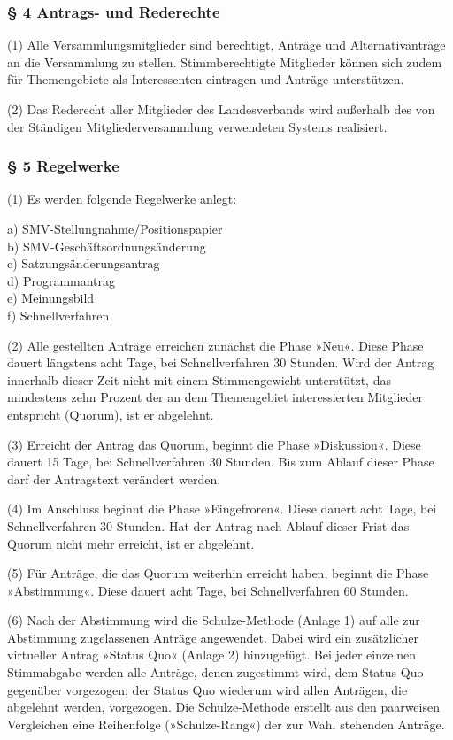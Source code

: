 \subsubsection{§ 4 Antrags- und Rederechte}

(1) Alle Versammlungsmitglieder sind berechtigt, Anträge und Alternativanträge an die Versammlung zu stellen. Stimmberechtigte Mitglieder können sich zudem für Themengebiete als Interessenten eintragen und Anträge unterstützen.

(2) Das Rederecht aller Mitglieder des Landesverbands wird außerhalb des von der Ständigen Mitgliederversammlung verwendeten Systems realisiert.

\subsubsection{§ 5 Regelwerke}

(1) Es werden folgende Regelwerke anlegt:

a) SMV-Stellungnahme/Positionspapier\\b) SMV-Geschäftsordnungsänderung \\c) Satzungsänderungsantrag\\d) Programmantrag\\e) Meinungsbild\\f) Schnellverfahren

(2) Alle gestellten Anträge erreichen zunächst die Phase »Neu«. Diese Phase dauert längstens acht Tage, bei Schnellverfahren 30 Stunden. Wird der Antrag innerhalb dieser Zeit nicht mit einem Stimmengewicht unterstützt, das mindestens zehn Prozent der an dem Themengebiet interessierten Mitglieder entspricht (Quorum), ist er abgelehnt.

(3) Erreicht der Antrag das Quorum, beginnt die Phase »Diskussion«. Diese dauert 15 Tage, bei Schnellverfahren 30 Stunden. Bis zum Ablauf dieser Phase darf der Antragstext verändert werden.

(4) Im Anschluss beginnt die Phase »Eingefroren«. Diese dauert acht Tage, bei Schnellverfahren 30 Stunden. Hat der Antrag nach Ablauf dieser Frist das Quorum nicht mehr erreicht, ist er abgelehnt.

(5) Für Anträge, die das Quorum weiterhin erreicht haben, beginnt die Phase »Abstimmung«. Diese dauert acht Tage, bei Schnellverfahren 60 Stunden.

(6) Nach der Abstimmung wird die Schulze-Methode (Anlage 1) auf alle zur Abstimmung zugelassenen Anträge angewendet. Dabei wird ein zusätzlicher virtueller Antrag »Status Quo« (Anlage 2) hinzugefügt. Bei jeder einzelnen Stimmabgabe werden alle Anträge, denen zugestimmt wird, dem Status Quo gegenüber vorgezogen; der Status Quo wiederum wird allen Anträgen, die abgelehnt werden, vorgezogen. Die Schulze-Methode erstellt aus den paarweisen Vergleichen eine Reihenfolge (»Schulze-Rang«) der zur Wahl stehenden Anträge.

